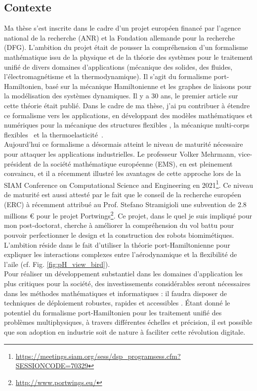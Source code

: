 \documentclass[french]{article}
\begin{document}
\subsection{Contexte}


Ma thèse s'est inscrite dans le cadre d'un projet européen financé par l'agence national de la recherche (ANR) et la Fondation allemande pour la recherche (DFG). L'ambition du projet était de pousser la compréhension d'un formalisme mathématique issu de la physique et de la théorie des systèmes pour le traitement unifié de divers domaines d'applications (mécanique des solides, des fluides, l'électromagnétisme et la thermodynamique). Il s'agit du formalisme port-Hamiltonien, bas\'e sur la mécanique Hamiltonienne et les graphes de liaisons pour la modélisation des systèmes dynamiques. Il y a 30 ans, le premier article sur cette théorie était publié. Dans le cadre de ma thèse, j'ai pu contribuer \`a étendre ce formalisme vers les applications, en développant des modèles mathématiques et numériques pour la mécanique des structures flexibles \cite{brugnoli2019ammmin,brugnoli2019ammkir}, la mécanique multi-corps flexibles~\cite{brugnoli2020msd} et la thermoelasticit\'e~\cite{brugnoli2021ther}. \\

Aujourd'hui ce formalisme a désormais atteint le niveau de maturit\'e nécessaire pour attaquer les applications industrielles. Le professeur Volker Mehrmann, vice-président de la société mathématique européenne (EMS), en est pleinement convaincu, et il a récemment illustré les avantages de cette approche  lors de la SIAM Conference on Computational Science and Engineering en 2021\footnote{\url{https://meetings.siam.org/sess/dsp_programsess.cfm?SESSIONCODE=70329}}. Ce niveau de maturit\'e est aussi attesté par le fait que le conseil de la recherche européen (ERC) \`a récemment attribu\'e au Prof. Stefano Stramigioli une subvention de 2.8 millions \euro{} pour le projet Portwings\footnote{\url{http://www.portwings.eu/}}. Ce projet, dans le quel je suis impliqu\'e pour mon post-doctorat, cherche \`a améliorer la compréhension du vol battu pour pouvoir perfectionner le design et la construction des robots biomimétiques. L'ambition réside dans le fait d'utiliser la théorie port-Hamiltonienne pour expliquer les interactions complexes entre l'aérodynamique et la flexibilit\'e de l'aile (cf. Fig. \ref{fig:pH_view_bird}). \\

Pour réaliser un développement substantiel dans les domaines d'application les plus critiques pour la société, des investissements considérables seront nécessaires dans les méthodes mathématiques et informatiques : il faudra disposer  de techniques de déploiement robustes, rapides et accessibles \cite{niederer2021}. Étant donné le potentiel du formalisme port-Hamiltonien pour les traitement unifié des problèmes multiphysiques, \`a travers différentes échelles et précision, il est possible que son adoption en industrie soit de nature \`a faciliter cette révolution digitale. 
\end{document}
